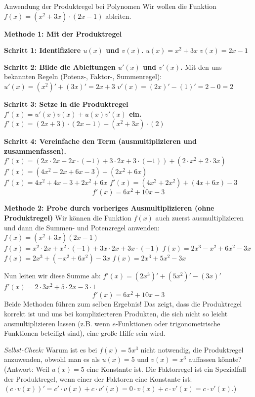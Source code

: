 \begin{beispielumgebung}{Anwendung der Produktregel bei Polynomen}
Wir wollen die Funktion $f(x) = (x^2+3x) \cdot (2x-1)$ ableiten.

\textbf{Methode 1: Mit der Produktregel}

\textbf{Schritt 1: Identifiziere $u(x)$ und $v(x)$.}
$u(x) = x^2+3x$
$v(x) = 2x-1$

\textbf{Schritt 2: Bilde die Ableitungen $u'(x)$ und $v'(x)$.}
Mit den uns bekannten Regeln (Potenz-, Faktor-, Summenregel):
$u'(x) = (x^2)' + (3x)' = 2x + 3$
$v'(x) = (2x)' - (1)' = 2 - 0 = 2$

\textbf{Schritt 3: Setze in die Produktregel $f'(x) = u'(x)v(x) + u(x)v'(x)$ ein.}
$f'(x) = (2x+3) \cdot (2x-1) + (x^2+3x) \cdot (2)$

\textbf{Schritt 4: Vereinfache den Term (ausmultiplizieren und zusammenfassen).}
$f'(x) = (2x \cdot 2x + 2x \cdot (-1) + 3 \cdot 2x + 3 \cdot (-1)) + (2 \cdot x^2 + 2 \cdot 3x)$
$f'(x) = (4x^2 - 2x + 6x - 3) + (2x^2 + 6x)$
$f'(x) = 4x^2 + 4x - 3 + 2x^2 + 6x$
$f'(x) = (4x^2 + 2x^2) + (4x + 6x) - 3$
\[ f'(x) = 6x^2 + 10x - 3 \]

\textbf{Methode 2: Probe durch vorheriges Ausmultiplizieren (ohne Produktregel)}
Wir können die Funktion $f(x)$ auch zuerst ausmultiplizieren und dann die Summen- und Potenzregel anwenden:
$f(x) = (x^2+3x)(2x-1)$
$f(x) = x^2 \cdot 2x + x^2 \cdot (-1) + 3x \cdot 2x + 3x \cdot (-1)$
$f(x) = 2x^3 - x^2 + 6x^2 - 3x$
$f(x) = 2x^3 + ( -x^2 + 6x^2) - 3x$
$f(x) = 2x^3 + 5x^2 - 3x$

Nun leiten wir diese Summe ab:
$f'(x) = (2x^3)' + (5x^2)' - (3x)'$
$f'(x) = 2 \cdot 3x^2 + 5 \cdot 2x - 3 \cdot 1$
\[ f'(x) = 6x^2 + 10x - 3 \]
Beide Methoden führen zum selben Ergebnis! Das zeigt, dass die Produktregel korrekt ist und uns bei komplizierteren Produkten, die sich nicht so leicht ausmultiplizieren lassen (z.B. wenn $e$-Funktionen oder trigonometrische Funktionen beteiligt sind), eine große Hilfe sein wird.
\end{beispielumgebung}

\textit{Selbst-Check:} Warum ist es bei $f(x) = 5x^3$ nicht notwendig, die Produktregel anzuwenden, obwohl man es als $u(x)=5$ und $v(x)=x^3$ auffassen könnte? (Antwort: Weil $u(x)=5$ eine Konstante ist. Die Faktorregel ist ein Spezialfall der Produktregel, wenn einer der Faktoren eine Konstante ist: $(c \cdot v(x))' = c' \cdot v(x) + c \cdot v'(x) = 0 \cdot v(x) + c \cdot v'(x) = c \cdot v'(x)$.)

